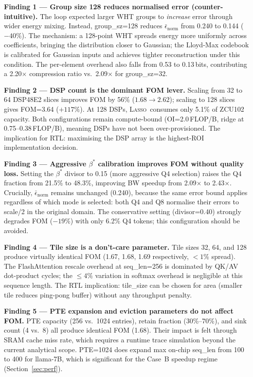\documentclass[conference]{IEEEtran}
\newcommand{\lasso}{\textsc{Lasso}}
\begin{document}
\textbf{Finding 1 --- Group size 128 reduces normalised error (counter-intuitive).}
The loop expected larger WHT groups to \emph{increase} error through
wider energy mixing. Instead, group\_sz=128 reduces $\bar\epsilon_\text{norm}$
from 0.240 to 0.144 ($-40\%$).  The mechanism: a 128-point WHT spreads
energy more uniformly across coefficients, bringing the distribution
closer to Gaussian; the Lloyd-Max codebook is calibrated for Gaussian
inputs and achieves tighter reconstruction under this condition.
The per-element overhead also falls from 0.53 to 0.13\,bits, contributing
a 2.20$\times$ compression ratio vs.\ 2.09$\times$ for group\_sz=32.

\textbf{Finding 2 --- DSP count is the dominant FOM lever.}
Scaling from 32 to 64 DSP48E2 slices improves FOM by 56\% ($1.68 \to 2.62$);
scaling to 128 slices gives FOM=3.64 ($+117\%$). At 128 DSPs, \lasso\
consumes only 5.1\% of ZCU102 capacity.  Both configurations remain
compute-bound (OI=2.0\,FLOP/B, ridge at 0.75--0.38\,FLOP/B), meaning
DSPs have not been over-provisioned.  The implication for RTL: maximising
the DSP array is the highest-ROI implementation decision.

\textbf{Finding 3 --- Aggressive $\beta^*$ calibration improves FOM without quality loss.}
Setting the $\beta^*$ divisor to 0.15 (more aggressive Q4 selection)
raises the Q4 fraction from 21.5\% to 48.3\%, improving BW speedup
from 2.09$\times$ to 2.43$\times$.  Crucially, $\bar\epsilon_\text{norm}$
remains unchanged (0.240), because the same error bound applies
regardless of which mode is selected: both Q4 and Q8 normalise their
errors to scale/2 in the original domain.  The conservative setting
(divisor=0.40) strongly degrades FOM ($-19\%$) with only 6.2\% Q4
tokens; this configuration should be avoided.

\textbf{Finding 4 --- Tile size is a don't-care parameter.}
Tile sizes 32, 64, and 128 produce virtually identical FOM (1.67, 1.68,
1.69 respectively, $<1\%$ spread). The FlashAttention rescale overhead
at seq\_len=256 is dominated by QK/AV dot-product cycles; the
${\leq}4\%$ variation in softmax overhead is negligible at this
sequence length.  The RTL implication: tile\_size can be chosen for
area (smaller tile reduces ping-pong buffer) without any throughput penalty.

\textbf{Finding 5 --- PTE expansion and eviction parameters do not affect FOM.}
PTE capacity (256 vs.\ 1024 entries), retain fraction (30\%--70\%),
and sink count (4 vs.\ 8) all produce identical FOM (1.68).  Their
impact is felt through SRAM cache miss rate, which requires a runtime
trace simulation beyond the current analytical scope.  PTE=1024 does
expand max on-chip seq\_len from 100 to 400 for llama-7B, which is
significant for the Case~B speedup regime (Section~\ref{sec:perf}).
\end{document}
